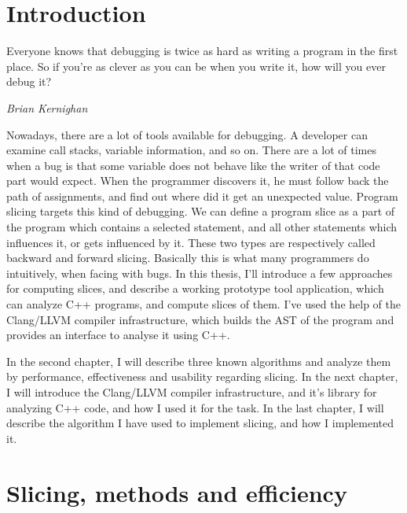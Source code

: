 \documentclass[oneside,12pt,a4paper]{book}
\begin{document}
\chapter{Introduction}
\epigraph{Everyone knows that debugging is twice as hard as writing a program in the first place. So if you're as clever as you can be when you write it, how will you ever debug it?}{\textit{Brian Kernighan}}

Nowadays, there are a lot of tools available for debugging. A developer can examine call stacks, variable information, and so on. There are a lot of times when a bug is that some variable does not behave like the writer of that code part would expect. When the programmer discovers it, he must follow back the path of assignments, and find out where did it get an unexpected value. Program slicing targets this kind of debugging. We can define a program slice as a part of the program which contains a selected statement, and all other statements which influences it, or gets influenced by it. These two types are respectively called backward and forward slicing. Basically this is what many programmers do intuitively, when facing with bugs. In this thesis, I'll introduce a few approaches for computing slices, and describe a working prototype tool application, which can analyze C++ programs, and compute slices of them. I've used the help of the Clang/LLVM compiler infrastructure, which builds the AST of the program and provides an interface to analyse it using C++.

In the second chapter, I will describe three known algorithms and analyze them by performance, effectiveness and usability regarding slicing. In the next chapter, I will introduce the Clang/LLVM compiler infrastructure, and it's library for analyzing C++ code, and how I used it for the task. In the last chapter, I will describe the algorithm I have used to implement slicing, and how I implemented it.

\chapter{Slicing, methods and efficiency}
\end{document}
